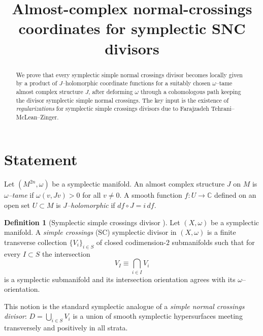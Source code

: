 \documentclass[11pt]{article}
\title{Almost-complex normal-crossings coordinates for symplectic SNC divisors}
\author{}
\date{}
\theoremstyle{definition}
\newtheorem{definition}[theorem]{Definition}
\begin{document}
\maketitle

\begin{abstract}
We prove that every symplectic simple normal crossings divisor becomes locally given by a product of
$J$--holomorphic coordinate functions for a suitably chosen $\omega$--tame almost complex structure $J$,
after deforming $\omega$ through a cohomologous path keeping the divisor symplectic simple normal
crossings. The key input is the existence of \emph{regularizations} for symplectic simple crossings divisors
due to Farajzadeh Tehrani--McLean--Zinger.
\end{abstract}

\section{Statement}

Let $(M^{2n},\omega)$ be a symplectic manifold. An almost complex structure $J$ on $M$ is
\emph{$\omega$--tame} if $\omega(v,Jv)>0$ for all $v\neq 0$. A smooth function $f\colon U\to\mathbb C$
defined on an open set $U\subset M$ is \emph{$J$--holomorphic} if $df\circ J = i\,df$.

\begin{definition}[Symplectic simple crossings divisor {\cite[Def.~2.1]{FTMZ}}]
Let $(X,\omega)$ be a symplectic manifold. A \emph{simple crossings} (SC) symplectic divisor in $(X,\omega)$
is a finite transverse collection $\{V_i\}_{i\in S}$ of closed codimension-$2$ submanifolds such that
for every $I\subset S$ the intersection
\[
V_I \equiv \bigcap_{i\in I}V_i
\]
is a symplectic submanifold and its intersection orientation agrees with its $\omega$--orientation.
\end{definition}

This notion is the standard symplectic analogue of a \emph{simple normal crossings divisor}:
$D=\bigcup_{i\in S}V_i$ is a union of smooth symplectic hypersurfaces meeting transversely and
positively in all strata.
\end{document}
